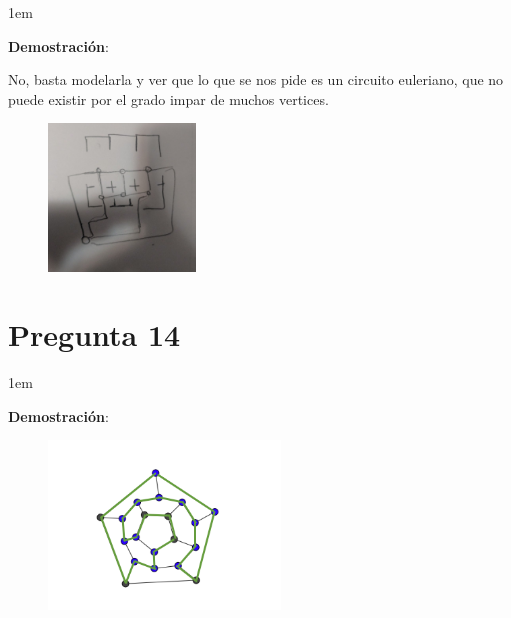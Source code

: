 \documentclass[12pt, fleqn]{article}                            %
\newenvironment{SmallIndentation}[1][0.75em]                    %
        {\begin{adjustwidth}{#1}{}\begin{footnotesize}}             %
        {\end{footnotesize}\end{adjustwidth}}                       %
\theoremstyle{break}                                            %
\begin{document}
        \begin{SmallIndentation}[1em]
            \textbf{Demostración}:
        
            No, basta modelarla y ver que lo que se nos pide es un circuito euleriano, que no puede existir por el grado impar de muchos vertices.

            \begin{figure}[h]
                \centering
                \includegraphics[width=0.35\textwidth]{Question13}
            \end{figure}



        \end{SmallIndentation}

    \section{Pregunta 14}

        \begin{SmallIndentation}[1em]
            \textbf{Demostración}:
        
            \begin{figure}[h]
                \centering
                \includegraphics[width=0.55\textwidth]{Question14}
            \end{figure}


        \end{SmallIndentation}
\end{document}

